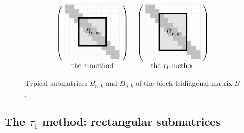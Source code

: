\documentclass[preprint,1p,11pt]{elsarticle}
\numberwithin{equation}{section}   %
\numberwithin{figure}{section}  %
\begin{document}
\begin{figure}
\[
\begin{tabular}{cc}
$
\begin{pmatrix}~
\begin{tikzpicture}[scale=0.45]
\fill[gray!20] (1.5,4.5) rectangle ++(3,-3);
\foreach \k in {0,0.5,...,5}
  \fill[gray!50] (\k,6-\k) rectangle ++(1.0,-1.0);
\draw[gray!30,very thin,step=0.5cm] (0,0) grid (6,6);
\draw[black,line width=0.7mm] (1.5,4.5) rectangle ++(3,-3);
\node at (3,3) {\Large $B_{n,k}$};
\end{tikzpicture}
~\end{pmatrix}
$
&
$
\begin{pmatrix}~
\begin{tikzpicture}[scale=0.45]
\fill[gray!20] (1.5,5) rectangle ++(3,-4);
\foreach \k in {0,0.5,...,5}
  \fill[gray!50] (\k,6-\k) rectangle ++(1.0,-1.0);
\draw[gray!30,very thin,step=0.5cm] (0,0) grid (6,6);
\draw[black,line width=0.7mm] (1.5,5) rectangle ++(3,-4);
\node at (3,3) {\Large $B^+_{n,k}$};
\end{tikzpicture}
~\end{pmatrix}
$
\\
the $\tau$-method
&
the $\tau_1$-method
\end{tabular}
\]

\vspace{-2ex}

\caption{Typical submatrices $B_{n,k}$ and $B^+_{n,k}$ of the block-tridiagonal matrix $B$.} \label{fig:three}
\end{figure}



\subsection{The $\tau_1$ method: rectangular submatrices} \label{sec:tau1}
\end{document}
